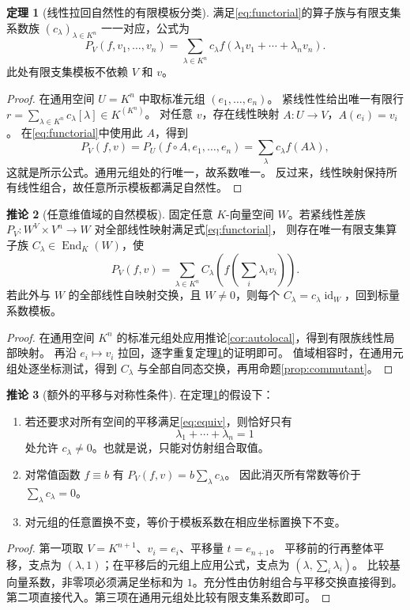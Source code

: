 \documentclass[UTF8,11pt,a4paper]{ctexart}
\theoremstyle{definition}
\newtheorem{theorem}{定理}[section]
\newtheorem{corollary}[theorem]{推论}
\newcommand{\End}{\operatorname{End}}
\newcommand{\id}{\operatorname{id}}
\begin{document}
\begin{theorem}[线性拉回自然性的有限模板分类]\label{thm:universal}
满足\eqref{eq:functorial}的算子族与有限支集系数族 $(c_\lambda)_{\lambda\in K^n}$ 一一对应，公式为
\begin{equation}\label{eq:universal}
 P_V(f,v_1,\ldots,v_n)
 =\sum_{\lambda\in K^n}c_\lambda
 f(\lambda_1v_1+\cdots+\lambda_nv_n).
\end{equation}
此处有限支集模板不依赖 $V$ 和 $v$。
\end{theorem}
\begin{proof}
在通用空间 $U=K^n$ 中取标准元组 $(e_1,\ldots,e_n)$。
紧线性性给出唯一有限行
$r=\sum_{\lambda\in K^n}c_\lambda[\lambda]\in K^{(K^n)}$。
对任意 $v$，存在线性映射 $A:U\to V$，$A(e_i)=v_i$。
在\eqref{eq:functorial}中使用此 $A$，得到
\[
 P_V(f,v)=P_U(f\circ A,e_1,\ldots,e_n)
 =\sum_\lambda c_\lambda f(A\lambda),
\]
这就是所示公式。通用元组处的行唯一，故系数唯一。
反过来，线性映射保持所有线性组合，故任意所示模板都满足自然性。
\end{proof}

\begin{corollary}[任意维值域的自然模板]\label{cor:operatornatural}
固定任意 $K$-向量空间 $W$。若紧线性差族
$P_V:W^V\times V^n\to W$ 对全部线性映射满足式\eqref{eq:functorial}，
则存在唯一有限支集算子族 $C_\lambda\in\End_K(W)$，使
\[
 P_V(f,v)=\sum_{\lambda\in K^n}C_\lambda
 \left(f\left(\sum_i\lambda_iv_i\right)\right).
\]
若此外与 $W$ 的全部线性自映射交换，且 $W\ne0$，则每个 $C_\lambda=c_\lambda\id_W$，回到标量系数模板。
\end{corollary}
\begin{proof}
在通用空间 $K^n$ 的标准元组处应用推论\ref{cor:autolocal}，得到有限族线性局部映射。
再沿 $e_i\mapsto v_i$ 拉回，逐字重复定理\ref{thm:universal}的证明即可。
值域相容时，在通用元组处逐坐标测试，得到 $C_\lambda$ 与全部自同态交换，再用命题\ref{prop:commutant}。
\end{proof}

\begin{corollary}[额外的平移与对称性条件]\label{cor:affine}
在定理\ref{thm:universal}的假设下：
\begin{enumerate}
\item 若还要求对所有空间的平移满足\eqref{eq:equiv}，则恰好只有
\[
 \lambda_1+\cdots+\lambda_n=1
\]
处允许 $c_\lambda\ne0$。也就是说，只能对仿射组合取值。
\item 对常值函数 $f\equiv b$ 有 $P_V(f,v)=b\sum_\lambda c_\lambda$。
因此消灭所有常数等价于 $\sum_\lambda c_\lambda=0$。
\item 对元组的任意置换不变，等价于模板系数在相应坐标置换下不变。
\end{enumerate}
\end{corollary}
\begin{proof}
第一项取 $V=K^{n+1}$、$v_i=e_i$、平移量 $t=e_{n+1}$。
平移前的行再整体平移，支点为 $(\lambda,1)$；在平移后的元组上应用公式，支点为 $(\lambda,\sum_i\lambda_i)$。
比较基向量系数，非零项必须满足坐标和为 $1$。充分性由仿射组合与平移交换直接得到。
第二项直接代入。第三项在通用元组处比较有限支集系数即可。
\end{proof}
\end{document}
